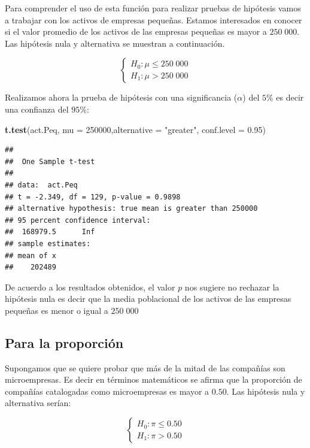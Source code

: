 \documentclass[letterpaper,]{book}
\newenvironment{Shaded}{\begin{snugshade}}{\end{snugshade}}
\newcommand{\DataTypeTok}[1]{\textcolor[rgb]{0.13,0.29,0.53}{#1}}
\newcommand{\DecValTok}[1]{\textcolor[rgb]{0.00,0.00,0.81}{#1}}
\newcommand{\FloatTok}[1]{\textcolor[rgb]{0.00,0.00,0.81}{#1}}
\newcommand{\KeywordTok}[1]{\textcolor[rgb]{0.13,0.29,0.53}{\textbf{#1}}}
\newcommand{\NormalTok}[1]{#1}
\newcommand{\StringTok}[1]{\textcolor[rgb]{0.31,0.60,0.02}{#1}}
\begin{document}
Para comprender el uso de esta función para realizar pruebas de hipótesis vamos a trabajar con los activos de empresas pequeñas. Estamos interesados en conocer si el valor promedio de los activos de las empresas pequeñas es mayor a \(250\;000\). Las hipótesis nula y alternativa se muestran a continuación.

\begin{equation} 
\begin{cases} 
H_0: \mu \leq 250\;000 \\ 
H_1: \mu > 250\;000
\end{cases} 
\end{equation}

Realizamos ahora la prueba de hipótesis con una significancia (\(\alpha\)) del \(5\%\) es decir una confianza del \(95\%\):

\begin{Shaded}
\begin{Highlighting}[]
\KeywordTok{t.test}\NormalTok{(act.Peq, }\DataTypeTok{mu =} \DecValTok{250000}\NormalTok{,}\DataTypeTok{alternative =} \StringTok{"greater"}\NormalTok{,  }\DataTypeTok{conf.level =} \FloatTok{0.95}\NormalTok{)}
\end{Highlighting}
\end{Shaded}

\begin{verbatim}
## 
##  One Sample t-test
## 
## data:  act.Peq
## t = -2.349, df = 129, p-value = 0.9898
## alternative hypothesis: true mean is greater than 250000
## 95 percent confidence interval:
##  168979.5      Inf
## sample estimates:
## mean of x 
##    202489
\end{verbatim}

De acuerdo a los resultados obtenidos, el valor \(p\) nos sugiere no rechazar la hipótesis nula es decir que la media poblacional de los activos de las empresas pequeñas es menor o igual a \(250\;000\)

\hypertarget{para-la-proporcion-1}{%
\subsection{Para la proporción}\label{para-la-proporcion-1}}

Supongamos que se quiere probar que más de la mitad de las compañías son microempresas. Es decir en términos matemáticos se afirma que la proporción de compañías catalogadas como microempresas es mayor a \(0.50\). Las hipótesis nula y alternativa serían:

\begin{equation} 
\begin{cases} 
H_0: \pi \leq 0.50 \\ 
H_1: \pi > 0.50
\end{cases} 
\end{equation}
\end{document}

